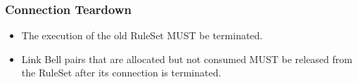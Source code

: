 \subsubsection{Connection Teardown}
\begin{itemize}
\item The execution of the old RuleSet MUST be terminated.
\item Link Bell pairs that are allocated but not consumed MUST be released from the RuleSet after its connection is terminated.
\end{itemize}



